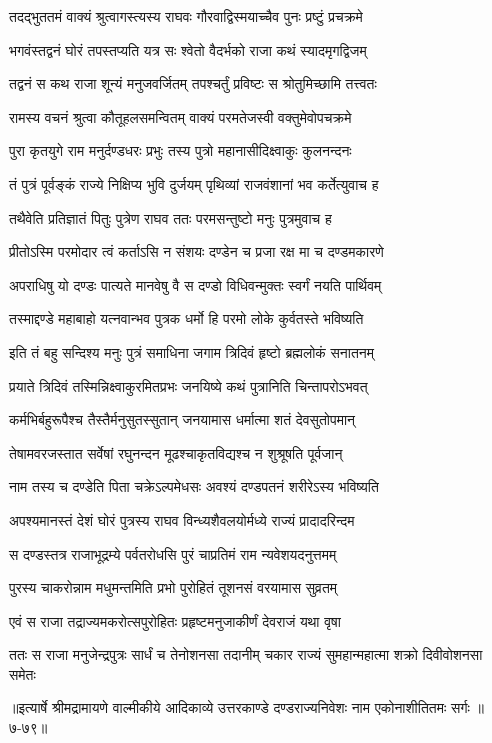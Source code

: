 
\twolineshloka
{तदद्भुततमं वाक्यं श्रुत्वागस्त्यस्य राघवः}
{गौरवाद्विस्मयाच्चैव पुनः प्रष्टुं प्रचक्रमे} %

\twolineshloka
{भगवंस्तद्वनं घोरं तपस्तप्यति यत्र सः}
{श्वेतो वैदर्भको राजा कथं स्यादमृगद्विजम्} %

\twolineshloka
{तद्वनं स कथ राजा शून्यं मनुजवर्जितम्}
{तपश्चर्तुं प्रविष्टः स श्रोतुमिच्छामि तत्त्वतः} %

\twolineshloka
{रामस्य वचनं श्रुत्वा कौतूहलसमन्वितम्}
{वाक्यं परमतेजस्वी वक्तुमेवोपचक्रमे} %

\twolineshloka
{पुरा कृतयुगे राम मनुर्दण्डधरः प्रभुः}
{तस्य पुत्रो महानासीदिक्ष्वाकुः कुलनन्दनः} %

\twolineshloka
{तं पुत्रं पूर्वङ्कं राज्ये निक्षिप्य भुवि दुर्जयम्}
{पृथिव्यां राजवंशानां भव कर्तेत्युवाच ह} %

\twolineshloka
{तथैवेति प्रतिज्ञातं पितुः पुत्रेण राघव}
{ततः परमसन्तुष्टो मनुः पुत्रमुवाच ह} %

\twolineshloka
{प्रीतोऽस्मि परमोदार त्वं कर्ताऽसि न संशयः}
{दण्डेन च प्रजा रक्ष मा च दण्डमकारणे} %

\twolineshloka
{अपराधिषु यो दण्डः पात्यते मानवेषु वै}
{स दण्डो विधिवन्मुक्तः स्वर्गं नयति पार्थिवम्} %

\twolineshloka
{तस्माद्दण्डे महाबाहो यत्नवान्भव पुत्रक}
{धर्मो हि परमो लोके कुर्वतस्ते भविष्यति} %

\twolineshloka
{इति तं बहु सन्दिश्य मनुः पुत्रं समाधिना}
{जगाम त्रिदिवं हृष्टो ब्रह्मलोकं सनातनम्} %

\twolineshloka
{प्रयाते त्रिदिवं तस्मिन्निक्ष्वाकुरमितप्रभः}
{जनयिष्ये कथं पुत्रानिति चिन्तापरोऽभवत्} %

\twolineshloka
{कर्मभिर्बहुरूपैश्च तैस्तैर्मनुसुतस्सुतान्}
{जनयामास धर्मात्मा शतं देवसुतोपमान्} %

\twolineshloka
{तेषामवरजस्तात सर्वेषां रघुनन्दन}
{मूढश्चाकृतविद्यश्च न शुश्रूषति पूर्वजान्} %

\twolineshloka
{नाम तस्य च दण्डेति पिता चक्रेऽल्पमेधसः}
{अवश्यं दण्डपतनं शरीरेऽस्य भविष्यति} %

\twolineshloka
{अपश्यमानस्तं देशं घोरं पुत्रस्य राघव}
{विन्ध्यशैवलयोर्मध्ये राज्यं प्रादादरिन्दम} %

\twolineshloka
{स दण्डस्तत्र राजाभूद्रम्ये पर्वतरोधसि}
{पुरं चाप्रतिमं राम न्यवेशयदनुत्तमम्} %

\twolineshloka
{पुरस्य चाकरोन्नाम मधुमन्तमिति प्रभो}
{पुरोहितं तूशनसं वरयामास सुव्रतम्} %

\twolineshloka
{एवं स राजा तद्राज्यमकरोत्सपुरोहितः}
{प्रहृष्टमनुजाकीर्णं देवराजं यथा वृषा} %

\twolineshloka
{ततः स राजा मनुजेन्द्रपुत्रः सार्धं च तेनोशनसा तदानीम्}
{चकार राज्यं सुमहान्महात्मा शक्रो दिवीवोशनसा समेतः} %


॥इत्यार्षे श्रीमद्रामायणे वाल्मीकीये आदिकाव्ये उत्तरकाण्डे दण्डराज्यनिवेशः नाम एकोनाशीतितमः सर्गः ॥७-७९॥

